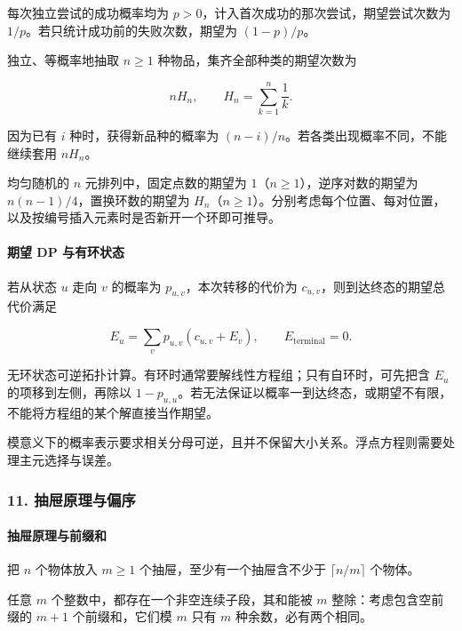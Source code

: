 每次独立尝试的成功概率均为 \(p>0\)，计入首次成功的那次尝试，期望尝试次数为 \(1/p\)。若只统计成功前的失败次数，期望为 \((1-p)/p\)。

独立、等概率地抽取 \(n\ge1\) 种物品，集齐全部种类的期望次数为

\[
nH_n,\qquad H_n=\sum_{k=1}^{n}\frac1k.
\]

因为已有 \(i\) 种时，获得新品种的概率为 \((n-i)/n\)。若各类出现概率不同，不能继续套用 \(nH_n\)。

均匀随机的 \(n\) 元排列中，固定点数的期望为 \(1\)（\(n\ge1\)），逆序对数的期望为 \(n(n-1)/4\)，置换环数的期望为 \(H_n\)（\(n\ge1\)）。分别考虑每个位置、每对位置，以及按编号插入元素时是否新开一个环即可推导。

\hypertarget{ux671fux671b-dp-ux4e0eux6709ux73afux72b6ux6001}{%
\paragraph{期望 DP 与有环状态}\label{ux671fux671b-dp-ux4e0eux6709ux73afux72b6ux6001}}

若从状态 \(u\) 走向 \(v\) 的概率为 \(p_{u,v}\)，本次转移的代价为 \(c_{u,v}\)，则到达终态的期望总代价满足

\[
E_u=\sum_v p_{u,v}(c_{u,v}+E_v),\qquad E_{\mathrm{terminal}}=0.
\]

无环状态可逆拓扑计算。有环时通常要解线性方程组；只有自环时，可先把含 \(E_u\) 的项移到左侧，再除以 \(1-p_{u,u}\)。若无法保证以概率一到达终态，或期望不有限，不能将方程组的某个解直接当作期望。

模意义下的概率表示要求相关分母可逆，且并不保留大小关系。浮点方程则需要处理主元选择与误差。

\hypertarget{ux62bdux5c49ux539fux7406ux4e0eux504fux5e8f}{%
\subsubsection{11. 抽屉原理与偏序}\label{ux62bdux5c49ux539fux7406ux4e0eux504fux5e8f}}

\hypertarget{ux62bdux5c49ux539fux7406ux4e0eux524dux7f00ux548c}{%
\paragraph{抽屉原理与前缀和}\label{ux62bdux5c49ux539fux7406ux4e0eux524dux7f00ux548c}}

把 \(n\) 个物体放入 \(m\ge1\) 个抽屉，至少有一个抽屉含不少于 \(\lceil n/m\rceil\) 个物体。

任意 \(m\) 个整数中，都存在一个非空连续子段，其和能被 \(m\) 整除：考虑包含空前缀的 \(m+1\) 个前缀和，它们模 \(m\) 只有 \(m\) 种余数，必有两个相同。


